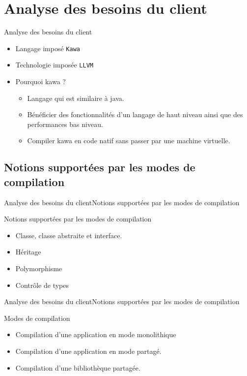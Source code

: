 \section{Analyse des besoins du client}
    \begin{frame}{Analyse des besoins du client}
      \begin{itemize}
        \item<1-> Langage imposé {\tt Kawa}
        \item<2-> Technologie imposée {\tt LLVM}
        \item<3-> Pourquoi kawa ?
          \begin{itemize}
            \item<4-> Langage qui est similaire à java.
            \item<5-> Bénéficier des fonctionnalités d'un langage de haut niveau ainsi que des performances bas niveau.
            \item<6-> Compiler kawa en code natif sans passer par une machine virtuelle.
          \end{itemize}
        
      \end{itemize}
    \end{frame}

  \subsection{Notions supportées par les modes de compilation}
    \begin{frame}{Analyse des besoins du client}{Notions supportées par les modes de compilation}
      \begin{block}{Notions supportées par les modes de compilation}
        \begin{itemize}
          \item<1-> Classe, classe abstraite et interface.
          \item<2-> Héritage
          \item<3-> Polymorphisme
          \item<4-> Contrôle de types
        \end{itemize}
      \end{block}
    \end{frame}
    \begin{frame}{Analyse des besoins du client}{Notions supportées par les modes de compilation}
      \begin{block}{Modes de compilation}
        \begin{itemize}
          \item<1-> Compilation d'une application en mode monolithique
          \item<2-> Compilation d'une application en mode partagé.
          \item<3-> Compilation d'une bibliothèque partagée.
        \end{itemize}
      \end{block}
    \end{frame}
